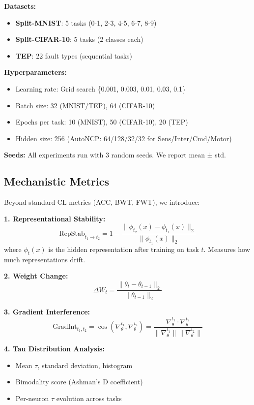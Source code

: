 \documentclass[11pt,twocolumn]{article}
\begin{document}
\textbf{Datasets:}
\begin{itemize}
    \item \textbf{Split-MNIST}: 5 tasks (0-1, 2-3, 4-5, 6-7, 8-9)
    \item \textbf{Split-CIFAR-10}: 5 tasks (2 classes each)
    \item \textbf{TEP}: 22 fault types (sequential tasks)
\end{itemize}

\textbf{Hyperparameters:}
\begin{itemize}
    \item Learning rate: Grid search \{0.001, 0.003, 0.01, 0.03, 0.1\}
    \item Batch size: 32 (MNIST/TEP), 64 (CIFAR-10)
    \item Epochs per task: 10 (MNIST), 50 (CIFAR-10), 20 (TEP)
    \item Hidden size: 256 (AutoNCP: 64/128/32/32 for Sens/Inter/Cmd/Motor)
\end{itemize}

\textbf{Seeds:} All experiments run with 3 random seeds. We report mean ± std.

\subsection{Mechanistic Metrics}

Beyond standard CL metrics (ACC, BWT, FWT), we introduce:

\textbf{1. Representational Stability:}
\begin{equation}
    \text{RepStab}_{t_1 \rightarrow t_2} = 1 - \frac{\| \phi_{t_2}(x) - \phi_{t_1}(x) \|_2}{\| \phi_{t_1}(x) \|_2}
\end{equation}
where $\phi_t(x)$ is the hidden representation after training on task $t$. Measures how much representations drift.

\textbf{2. Weight Change:}
\begin{equation}
    \Delta W_t = \frac{\| \theta_{t} - \theta_{t-1} \|_2}{\| \theta_{t-1} \|_2}
\end{equation}

\textbf{3. Gradient Interference:}
\begin{equation}
    \text{GradInt}_{t_1, t_2} = \cos(\nabla_{\theta}^{t_1}, \nabla_{\theta}^{t_2}) = \frac{\nabla_{\theta}^{t_1} \cdot \nabla_{\theta}^{t_2}}{\| \nabla_{\theta}^{t_1} \| \| \nabla_{\theta}^{t_2} \|}
\end{equation}

\textbf{4. Tau Distribution Analysis:}
\begin{itemize}
    \item Mean $\tau$, standard deviation, histogram
    \item Bimodality score (Ashman's D coefficient)
    \item Per-neuron $\tau$ evolution across tasks
\end{itemize}
\end{document}

